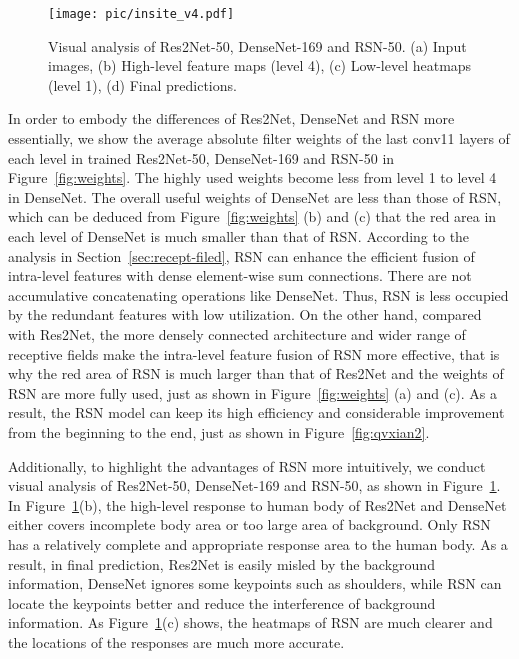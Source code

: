 \documentclass[runningheads]{llncs}
\begin{document}
\begin{figure}[h]

 \centering
\texttt{[image: pic/insite\_v4.pdf]} \caption{Visual analysis of Res2Net-50, DenseNet-169 and RSN-50. (a) Input images, (b) High-level feature maps (level 4), (c) Low-level heatmaps (level 1), (d) Final predictions.} \label{fig:feature} \end{figure}

In order to embody the differences of Res2Net, DenseNet and RSN more essentially, we show the average absolute filter weights of the last conv11 layers of each level in trained Res2Net-50, DenseNet-169 and RSN-50 in Figure~\ref{fig:weights}. The highly used weights become less from level 1 to level 4 in DenseNet. The overall useful weights of DenseNet are less than those of RSN, which can be deduced from Figure~\ref{fig:weights} (b) and (c) that the red area in each level of DenseNet is much smaller than that of RSN. According to the analysis in Section~\ref{sec:recept-filed}, RSN can enhance the efficient fusion of intra-level features with dense element-wise sum connections. There are not accumulative concatenating operations like DenseNet. Thus, RSN is less occupied by the redundant features with low utilization. On the other hand, compared with Res2Net, the more densely connected architecture and wider range of receptive fields make the intra-level feature fusion of RSN more effective, that is why the red area of RSN is much larger than that of Res2Net and the weights of RSN are more fully used, just as shown in Figure~\ref{fig:weights} (a) and (c). As a result, the RSN model can keep its high efficiency and considerable improvement from the beginning to the end, just as shown in Figure~\ref{fig:qvxian2}.











Additionally, to highlight the advantages of RSN more intuitively, we conduct visual analysis of Res2Net-50, DenseNet-169 and RSN-50, as shown in Figure~\ref{fig:feature}. In Figure~\ref{fig:feature}(b), the high-level response to human body of Res2Net and DenseNet either covers incomplete body area or too large area of background. Only RSN has a relatively complete and appropriate response area to the human body. As a result, in final prediction, Res2Net is easily misled by the background information, DenseNet ignores some keypoints such as shoulders, while RSN can locate the keypoints better and reduce the interference of background information. As Figure~\ref{fig:feature}(c) shows, the heatmaps of RSN are much clearer and the locations of the responses are much more accurate.
\end{document}

